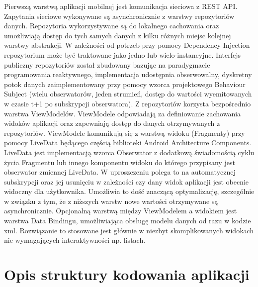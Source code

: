 \documentclass[polish, 11pt]{article}
\begin{document}
    Pierwszą warstwą aplikacji mobilnej jest komunikacja sieciowa z REST API. Zapytania sieciowe wykonywane są asynchronicznie z warstwy repozytoriów danych. Repozytoria wykorzystywane są do lokalnego cachowania oraz umożliwiają dostęp do tych samych danych z kilku różnych miejsc kolejnej warstwy abstrakcji. W zależności od potrzeb przy pomocy Dependency Injection repozytorium może być traktowane jako jedno lub wielo-instancyjne. Interfejs publiczny repozytoriów został zbudowany bazując na paradygmacie programowania reaktywnego, implementacja udostępnia obserwowalny, dyskretny potok danych zaimplementowany przy pomocy wzorca projektowego Behaviour Subject (wielu obserwatorów, jeden strumień, dostęp do wartości wyemitowanych w czasie t+1 po subskrypcji obserwatora). Z repozytoriów korzysta bezpośrednio warstwa ViewModelów. ViewModele odpowiadają za definiowanie zachowania widoków aplikacji oraz zapewniają dostęp do danych otrzymywanych z repozytoriów.
    ViewModele komunikują się z warstwą widoku (Fragmenty) przy pomocy LiveData będącego częścią biblioteki Android Architecture Components. LiveData jest implementacją wzorca Obserwator z dodatkową świadomością cyklu życia Fragmentu lub innego komponentu widoku do którego przypisany jest obserwator zmiennej LiveData. W uproszczeniu polega to na automatycznej subskrypcji oraz jej usunięciu w zależności czy dany widok aplikacji jest obecnie widoczny dla użytkownika. Umożliwia to dość znaczącą optymalizację, szczególnie w związku z tym, że z niższych warstw nowe wartości otrzymywane są asynchronicznie. Opcjonalną warstwą między ViewModelem a widokiem jest warstwa Data Bindingu, umożliwiająca obsługę modelu danych od razu w kodzie xml. Rozwiązanie to stosowane jest głównie w niezbyt skomplikowanych widokach nie wymagających interaktywności np. listach.     
        
\section{Opis struktury kodowania aplikacji} %
\end{document}
